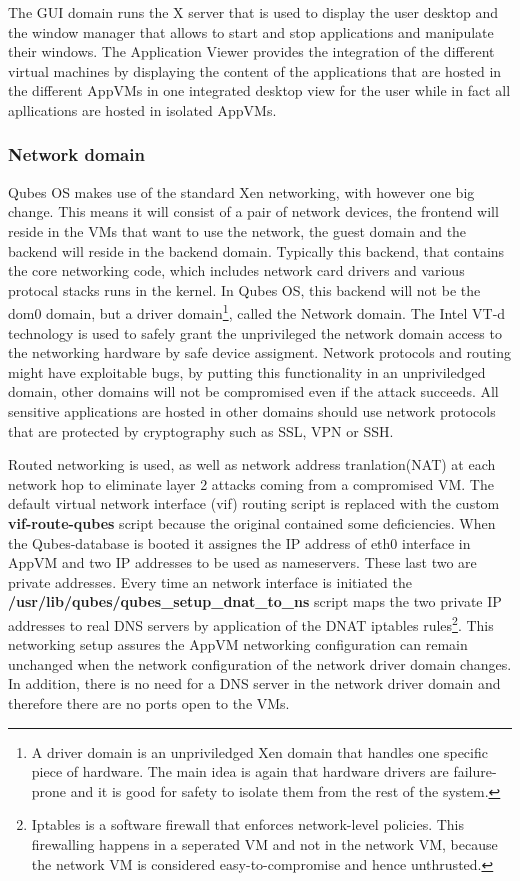 \documentclass[runningheads,a4paper]{article}
\begin{document}
The GUI domain runs the X server that is used to display the user desktop and
the window manager that allows to start and stop applications and
manipulate their windows. The Application Viewer provides the
integration of the different virtual machines by displaying the
content of the applications that are hosted in the
different AppVMs in one integrated desktop view for
the user while in fact all apllications are hosted in isolated AppVMs.


\subsubsection{Network domain}

Qubes OS makes use of the standard Xen networking, with however one
big change. This means it will consist of a pair of network devices,
the frontend will reside in the VMs that want to use the network, the
guest domain and the backend will reside in the backend
domain. Typically this backend, that contains the core networking
code, which includes network card drivers and various protocal stacks
runs in the kernel. In Qubes OS, this backend will not be the dom0
domain, but a driver domain\footnote{A driver domain is an
unpriviledged Xen domain that handles one specific piece of
hardware. The main idea is again that hardware drivers are
failure-prone and it is good for safety to isolate them from the rest
of the system.}, called the Network domain. The Intel VT-d technology
is used to safely grant the unprivileged the network domain access to
the networking hardware by safe device assigment. Network protocols
and routing might have exploitable bugs, by putting this functionality
in an unpriviledged domain, other domains will not be compromised even
if the attack succeeds. All sensitive applications are hosted in other
domains should use network protocols that are protected by
cryptography such as SSL, VPN or SSH.

Routed networking is used, as well as  network address tranlation(NAT)
at each network hop to eliminate layer 2 attacks coming from a
compromised VM. The default virtual network interface (vif) routing
script is replaced with the custom \textbf{vif-route-qubes} script
because the original contained some deficiencies. When the
Qubes-database is booted it assignes the IP address of eth0 interface
in AppVM and two IP addresses to be used as nameservers. These last
two are private addresses. Every time an network interface is
initiated the \textbf{/usr/lib/qubes/qubes\_setup\_dnat\_to\_ns} script
maps the two private IP addresses to real DNS servers by application
of the DNAT iptables rules\footnote{Iptables is a software firewall that
enforces network-level policies. This firewalling happens in a
seperated VM and not in the network VM, because the network VM is
considered easy-to-compromise and hence unthrusted.}. This networking
setup assures the AppVM networking configuration can remain unchanged
when the network configuration of the network driver domain
changes. In addition, there is no need for a DNS server in the network
driver domain and therefore there are no ports open to the VMs.
\end{document}
